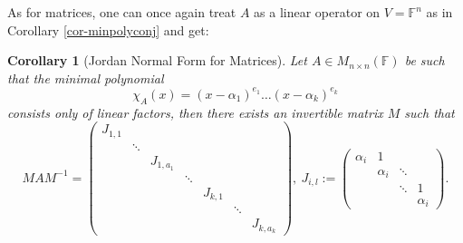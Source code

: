 \documentclass[12pt]{amsbook}
\newtheorem{corollary}[theorem]{Corollary}
\begin{document}
As for matrices, one can once again treat $A$ as a linear operator on $V = \mathbb{F}^n$ as in Corollary \ref{cor-minpolyconj} and get:
\begin{corollary}[Jordan Normal Form for Matrices]
    Let $A \in M_{n \times n}(\mathbb{F})$ be such that the minimal polynomial
$$\chi_A(x) = (x-\alpha_1)^{e_1} \dots (x - \alpha_k)^{e_k}$$
consists only of linear factors, then there exists an invertible matrix $M$ such that
$$MAM^{-1} = \begin{pmatrix} J_{1,1} & & & & & \\
& \ddots & & & & & \\ 
& & J_{1,a_1} & & & & \\
& & & \ddots & & &\\
& & & & J_{k,1} & & \\
& & & & & \ddots & \\
& & & & & & J_{k,a_k}\end{pmatrix},\ J_{i,l} := \begin{pmatrix} \alpha_i & 1 & & \\
 & \alpha_i & \ddots & \\
 &  & \ddots & 1 \\
 &  &  & \alpha_i \end{pmatrix}.
$$
\end{corollary}
\end{document}
